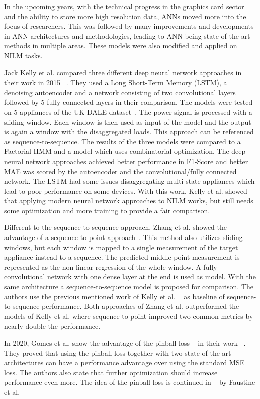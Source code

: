 \documentclass[sigconf]{acmart}
\begin{document}
In the upcoming years, with the technical progress in the graphics card sector and the ability to store more high resolution data, ANNs moved more into the focus of researchers.
This was followed by many improvements and developments in ANN architectures and methodologies, leading to ANN being state of the art methods in multiple areas.
These models were also modified and applied on NILM tasks.

Jack Kelly et al. compared three different deep neural network approaches in their work in 2015 ~\cite{Kelly2015NeuralND}.
They used a Long Short-Term Memory (LSTM), a denoising autoencoder and a network consisting of two convolutional layers followed by 5 fully connected layers in their comparison.
The models were tested on 5 appliances of the UK-DALE dataset~\cite{UK-DALE}. 
The power signal is processed with a sliding window.
Each window is then used as input of the model and the output is again a window with the disaggregated loads.
This approach can be referenced as sequence-to-sequence.
The results of the three models were compared to a Factorial HMM and a model which uses combinatorial optimization.
The deep neural network approaches achieved better performance in F1-Score and better MAE was scored by the autoencoder and the convolutional/fully connected network.
The LSTM had some issues disaggregating multi-state appliances which lead to poor performance on some devices.
With this work, Kelly et al. showed that applying modern neural network approaches to NILM works, but still needs some optimization and more training to provide a fair comparison.

Different to the sequence-to-sequence approach, Zhang et al. showed the advantage of a sequence-to-point approach~\cite{sequencetopoint}.
This method also utilizes sliding windows, but each window is mapped to a single measurement of the target appliance instead to a sequence.
The predicted middle-point measurement is represented as the non-linear regression of the whole window.
A fully convolutional network with one dense layer at the end is used as model.
With the same architecture a sequence-to-sequence model is proposed for comparison.
The authors use the previous mentioned work of Kelly et al. ~\cite{Kelly2015NeuralND} as baseline of sequence-to-sequence performance.
Both approaches of Zhang et al. outperformed the models of Kelly et al. where sequence-to-point improved two common metrics by nearly double the performance.

In 2020, Gomes et al. show the advantage of the pinball loss ~\cite{Steinwart_2011} in their work ~\cite{PB-NILM}.
They proved that using the pinball loss together with two state-of-the-art architectures can have a performance advantage over using the standard MSE loss.
The authors also state that further optimization should increase performance even more.
The idea of the pinball loss is continued in ~\cite{unetnilm} by Faustine et al.
\end{document}
